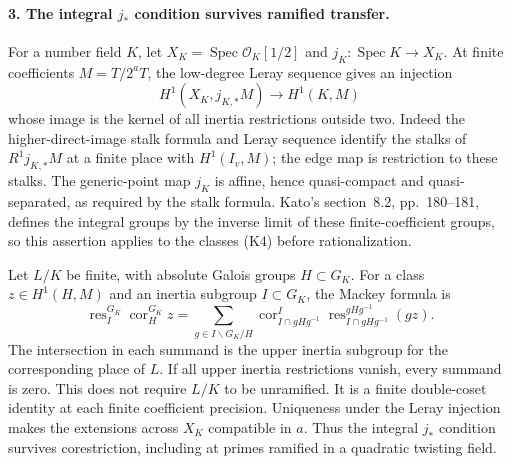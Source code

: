\paragraph{3. The integral $j_*$ condition survives ramified transfer.}
For a number field $K$, let $X_K=\operatorname{Spec}\mathcal O_K[1/2]$
and $j_K:\operatorname{Spec}K\to X_K$. At finite coefficients
$M=T/2^aT$, the low-degree Leray sequence gives an injection
\[
 H^1(X_K,j_{K,*}M)\longrightarrow H^1(K,M)
\]
whose image is the kernel of all inertia restrictions outside two.
Indeed the higher-direct-image stalk formula and Leray sequence
\cite[Tags 03Q9 and 03QA]{stackscohom} identify the stalks of
$R^1j_{K,*}M$ at a finite place with $H^1(I_v,M)$;
the edge map is restriction to these stalks. The generic-point map
$j_K$ is affine, hence quasi-compact and quasi-separated, as required
by the stalk formula. Kato's section~8.2,
pp.~180--181, defines the integral groups by the inverse limit of
these finite-coefficient groups, so this assertion applies to the
classes (K4) before rationalization.

Let $L/K$ be finite, with absolute Galois groups $H\subset G_K$.
For a class $z\in H^1(H,M)$ and an inertia subgroup $I\subset G_K$,
the Mackey formula is
\[
 \operatorname{res}_{I}^{G_K}\operatorname{cor}_{H}^{G_K}z
 =\sum_{g\in I\backslash G_K/H}
   \operatorname{cor}_{I\cap gHg^{-1}}^{I}
   \operatorname{res}_{I\cap gHg^{-1}}^{gHg^{-1}}(g z).    \tag{K7}
\]
The intersection in each summand is the upper inertia subgroup
for the corresponding place of $L$. If all upper inertia
restrictions vanish, every summand is zero. This does not require
$L/K$ to be unramified. It is a finite double-coset identity at each
finite coefficient precision. Uniqueness under the Leray injection
makes the extensions across $X_K$ compatible in $a$. Thus the
integral $j_*$ condition survives corestriction, including at primes
ramified in a quadratic twisting field.

